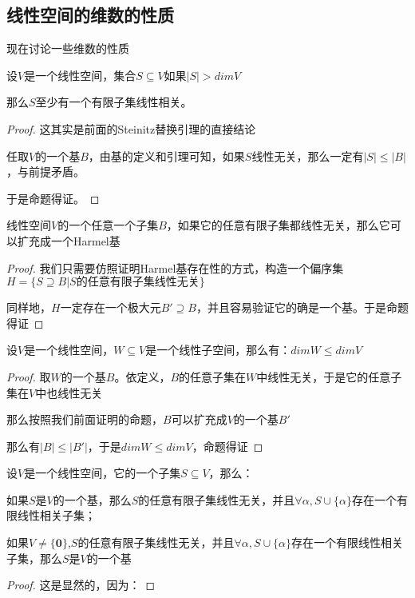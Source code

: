 \documentclass[12pt, a4paper, oneside, UTF8]{ctexbook}
\begin{document}
		\subsection{线性空间的维数的性质}
			现在讨论一些维数的性质
			\begin{para}{0}
				\point{}
					\begin{proposition}
						设$V$是一个线性空间，集合$S \subseteq V$如果$|S| > dim V$

						那么$S$至少有一个有限子集线性相关。
					\end{proposition}
					\begin{proof}
						这其实是前面的Steinitz替换引理的直接结论

						任取$V$的一个基$B$，由基的定义和引理可知，如果$S$线性无关，那么一定有$|S| \leqslant |B|$，与前提矛盾。

						于是命题得证。
					\end{proof}
				\point{}
					\begin{proposition}
						线性空间$V$的一个任意一个子集$B$，如果它的任意有限子集都线性无关，那么它可以扩充成一个Harmel基
					\end{proposition}
					\begin{proof}
						我们只需要仿照证明Harmel基存在性的方式，构造一个偏序集$H=\{S \supseteq B| S\text{的任意有限子集线性无关}\}$

						同样地，$H$一定存在一个极大元$B' \supseteq B$，并且容易验证它的确是一个基。于是命题得证
					\end{proof}
				\point{}
					\begin{proposition}
						设$V$是一个线性空间，$W \subseteq V$是一个线性子空间，那么有：$dim W \leqslant dim V$
					\end{proposition}
					\begin{proof}
						取$W$的一个基$B$。依定义，$B$的任意子集在$W$中线性无关，于是它的任意子集在$V$中也线性无关
						
						那么按照我们前面证明的命题，$B$可以扩充成$V$的一个基$B'$

						那么有$|B| \leqslant |B'|$，于是$dim W \leqslant dim V$，命题得证
					\end{proof}
				\point{}
					\begin{proposition}
						设$V$是一个线性空间，它的一个子集$S \subseteq V$，那么：

						如果$S$是$V$的一个基，那么$S$的任意有限子集线性无关，并且$\forall \alpha ,S \cup \{\alpha \}$存在一个有限线性相关子集；

						如果$V \neq \{\mathbf{0}\}$,$S$的任意有限子集线性无关，并且$\forall \alpha ,S \cup \{\alpha \}$存在一个有限线性相关子集，那么$S$是$V$的一个基
					\end{proposition}
					\begin{proof}
						这是显然的，因为：


\end{proof}
\end{para}
\end{document}
